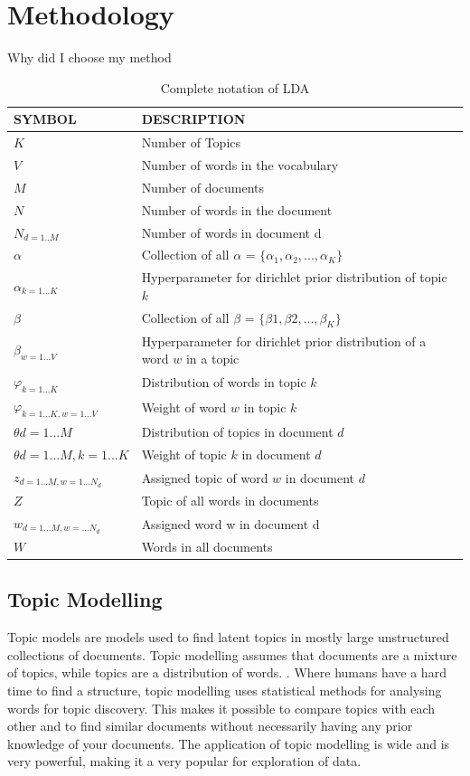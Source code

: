 \chapter{Methodology}  \label{ch:methodology}

Why did I choose my method

\begin{table}[h]
\centering
 \begin{tabular}{l l} 
 \hline
 SYMBOL & DESCRIPTION \\ 
 \hline
 $K$ & Number of Topics \\  
 $V$ & Number of words in the vocabulary \\
 $M$ & Number of documents \\
 $N$ & Number of words in the document \\
 $N_{d=1..M}$ & Number of words in document d\\
 $\alpha$ & Collection of all $\alpha$ = $ \{ \alpha_{1},\alpha_{2}, ... , \alpha_{K}\}$ \\
 $\alpha_{k=1...K}$ & Hyperparameter for dirichlet prior distribution of topic $k$ \\
 $\beta$ &  Collection of all $\beta$ = $\{\beta{1},\beta{2}, ... , \beta_{K}\}$ \\
 $\beta_{w=1...V}$ & Hyperparameter for dirichlet prior distribution of a word $w$ in a topic \\
 $\varphi_{k=1...K}$ & Distribution of words in topic $k$ \\
 $\varphi_{k=1...K, w=1...V}$ & Weight of  word $w$ in topic $k$  \\
 $\theta{d=1...M}$ & Distribution of topics in document $d$  \\
 $\theta{d=1...M, k=1...K}$ & Weight of  topic $k$ in document $d$ \\
 $z_{d=1...M, w=1...N_d}$ & Assigned topic of word $w$ in document $d$\\
 $Z$ & Topic of all words in documents \\
 $w_{d=1...M, w=...N_d}$ & Assigned word w in document d \\ 
 $W$ & Words in all documents \\ 

 \hline
 \end{tabular}
\caption{Complete notation of LDA}
\label{tab:table1}
\end{table}

\section{Topic Modelling}\label{lda:tm}
Topic models are models used to find latent topics in mostly large unstructured collections of documents. Topic modelling assumes that documents are a mixture of topics, while topics are a distribution of words. \cite{Blei2010ProbabilisticModels}. Where humans have a hard time to find a structure, topic modelling uses statistical methods for analysing words for topic discovery. This makes it possible to compare topics with each other and to find similar documents without necessarily having any prior knowledge of your documents. The application of topic modelling is wide and is very powerful, making it a very popular for exploration of data. 

